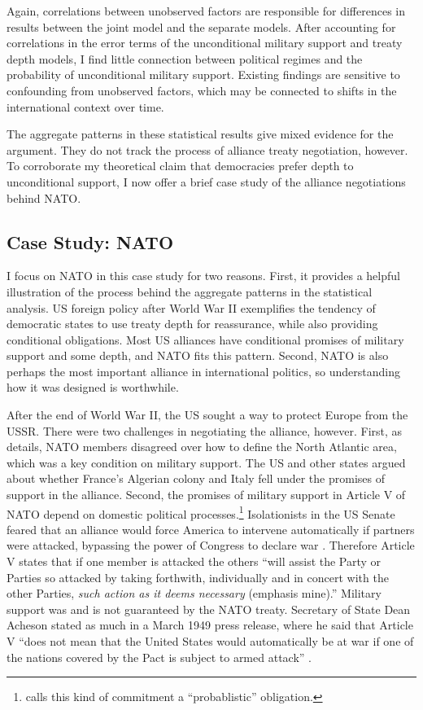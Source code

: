 \documentclass[12pt]{article}
\begin{document}
Again, correlations between unobserved factors are responsible for differences in results between the joint model and the separate models. 
After accounting for correlations in the error terms of the unconditional military support and treaty depth models, I find little connection between political regimes and the probability of unconditional military support. 
Existing findings are sensitive to confounding from unobserved factors, which may be connected to shifts in the international context over time. 
 

The aggregate patterns in these statistical results give mixed evidence for the argument. 
They do not track the process of alliance treaty negotiation, however. 
To corroborate my theoretical claim that democracies prefer depth to unconditional support, I now offer a brief case study of the alliance negotiations behind NATO. 


\subsection{Case Study: NATO}


I focus on NATO in this case study for two reasons. 
First, it provides a helpful illustration of the process behind the aggregate patterns in the statistical analysis. 
US foreign policy after World War II exemplifies the tendency of democratic states to use treaty depth for reassurance, while also providing conditional obligations.  
Most US alliances have conditional promises of military support and some depth, and NATO fits this pattern.
Second, NATO is also perhaps the most important alliance in international politics, so understanding how it was designed is worthwhile. 


After the end of World War II, the US sought a way to protect Europe from the USSR. 
There were two challenges in negotiating the alliance, however.
First, as \citet{Poast2019a} details, NATO members disagreed over how to define the North Atlantic area, which was a key condition on military support. 
The US and other states argued about whether France's Algerian colony and Italy fell under the promises of support in the alliance. 
Second, the promises of military support in Article V of NATO depend on domestic political processes.\footnote{\citet{Benson2012} calls this kind of commitment a ``probablistic'' obligation.} 
Isolationists in the US Senate feared that an alliance would force America to intervene automatically if partners were attacked, bypassing the power of Congress to declare war \citep[pg. 280-1]{Acheson1969}.
Therefore Article V states that if one member is attacked the others ``will assist the Party or Parties so attacked by taking forthwith, individually and in concert with the other Parties, \emph{such action as it deems necessary} (emphasis mine).'' 
Military support was and is not guaranteed by the NATO treaty. 
Secretary of State Dean Acheson stated as much in a March 1949 press release, where he said that Article V ``does not mean that the United States would automatically be at war if one of the nations covered by the Pact is subject to armed attack'' \citep{Acheson1949}. 
\end{document}
